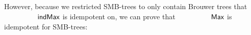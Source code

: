 \begin{code}%
%
\>[2]\AgdaSpace{}%
\AgdaSymbol{:}\AgdaSpace{}%
\AgdaSpace{}%
\AgdaSymbol{\{}\AgdaSpace{}%
\AgdaSpace{}%
\AgdaSpace{}%
\AgdaSpace{}%
\AgdaSymbol{:}\AgdaSpace{}%
\AgdaSymbol{\}}\<%
\\
\>[2][@{}l@{\AgdaIndent{0}}]%
\>[4]\AgdaSpace{}%
\AgdaSpace{}%
\AgdaOperator{\AgdaFunction{<}}\AgdaSpace{}%
\AgdaSpace{}%
\AgdaSpace{}%
\AgdaSpace{}%
\AgdaOperator{\AgdaFunction{<}}\AgdaSpace{}%
\AgdaSpace{}%
\AgdaSpace{}%
\AgdaSpace{}%
\AgdaSpace{}%
\AgdaSpace{}%
\AgdaOperator{\AgdaFunction{<}}\AgdaSpace{}%
\AgdaSpace{}%
\AgdaSpace{}%
\<%
\\
%
\\[\AgdaEmptyExtraSkip]%
%
\>[2]\AgdaSpace{}%
\AgdaSymbol{:}\AgdaSpace{}%
\AgdaSpace{}%
\AgdaSymbol{\{}\AgdaSpace{}%
\AgdaSpace{}%
\AgdaSpace{}%
\AgdaSpace{}%
\AgdaSymbol{:}\AgdaSpace{}%
\AgdaSymbol{\}}\<%
\\
\>[2][@{}l@{\AgdaIndent{0}}]%
\>[4]\AgdaSpace{}%
\AgdaSpace{}%
\AgdaSpace{}%
\AgdaSpace{}%
\AgdaSpace{}%
\AgdaSpace{}%
\AgdaSpace{}%
\AgdaSpace{}%
\AgdaSpace{}%
\AgdaSpace{}%
\AgdaSpace{}%
\AgdaSpace{}%
\AgdaOperator{\AgdaFunction{<}}\AgdaSpace{}%
\AgdaSpace{}%
\AgdaSymbol{(}\AgdaSpace{}%
\AgdaSymbol{)}\AgdaSpace{}%
\AgdaSymbol{(}\AgdaSpace{}%
\AgdaSymbol{)}\<%
\end{code}

However, because we restricted SMB-trees to only contain Brouwer trees that
$\indMax$ is idempotent on, we can prove that $\AgdaFunction{Max}$ is
idempotent for SMB-trees:

\begin{code}%
%
\>[2]\AgdaSpace{}%
\AgdaSymbol{:}\AgdaSpace{}%
\AgdaSpace{}%
\AgdaSymbol{\{}\AgdaSpace{}%
\AgdaSymbol{:}\AgdaSpace{}%
\AgdaSymbol{\}}\AgdaSpace{}%
\AgdaSpace{}%
\AgdaSpace{}%
\AgdaSpace{}%
\AgdaSpace{}%
\AgdaSpace{}%
\<%
\\
%
\>[2]\AgdaSpace{}%
\AgdaSymbol{\{}\AgdaSpace{}%
\AgdaSymbol{=}\AgdaSpace{}%
\AgdaSpace{}%
\AgdaSpace{}%
\AgdaSymbol{\}}\AgdaSpace{}%
\AgdaSymbol{=}\AgdaSpace{}%
\AgdaSpace{}%
\<%
\end{code}

